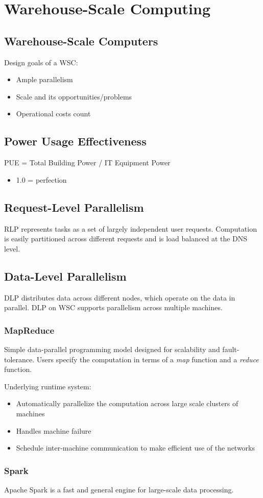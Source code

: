\chapter{Warehouse-Scale Computing}

\section{Warehouse-Scale Computers}
Design goals of a WSC:
\begin{itemize}
    \item Ample parallelism
    \item Scale and its opportunities/problems
    \item Operational costs count
\end{itemize}

\section{Power Usage Effectiveness}
PUE = Total Building Power / IT Equipment Power
\begin{itemize}
    \item 1.0 = perfection
\end{itemize}

\section{Request-Level Parallelism}
RLP represents tasks as a set of largely independent user requests. Computation is easily partitioned across different requests and is load balanced at the DNS level.

\section{Data-Level Parallelism}
DLP distributes data across different nodes, which operate on the data in parallel. DLP on WSC supports parallelism across multiple machines.

\subsection{MapReduce}
Simple data-parallel programming model designed for scalability and fault-tolerance. Users specify the computation in terms of a \emph{map} function and a \emph{reduce} function.

\medskip

Underlying runtime system:
\begin{itemize}
    \item Automatically parallelize the computation across large scale clusters of machines
    \item Handles machine failure
    \item Schedule inter-machine communication to make efficient use of the networks
\end{itemize}

\subsection{Spark}
Apache Spark is a fast and general engine for large-scale data processing.



